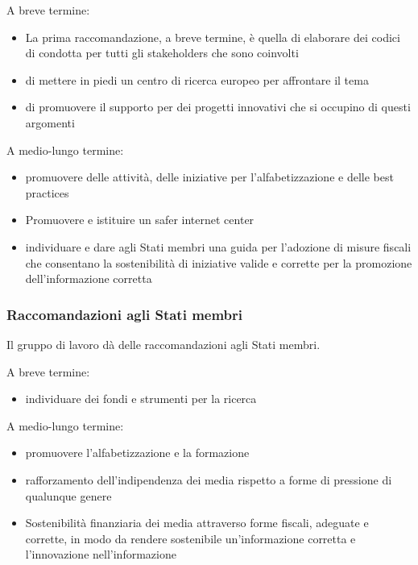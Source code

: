 A breve termine: 
\begin{itemize}
    \item La prima raccomandazione, a breve termine, è quella di elaborare dei codici di condotta per tutti gli stakeholders che sono coinvolti
    \item di mettere in piedi un centro di ricerca europeo per affrontare il tema
    \item di promuovere il supporto per dei progetti innovativi che si occupino di questi argomenti
\end{itemize}

A medio-lungo termine:

\begin{itemize}
    \item promuovere delle attività, delle iniziative per l'alfabetizzazione e delle best practices
    \item Promuovere e istituire un safer internet center
    \item individuare e dare agli Stati membri una guida per l'adozione di misure fiscali che consentano la sostenibilità di iniziative valide e corrette per la promozione dell'informazione corretta
\end{itemize}

\subsubsection{Raccomandazioni agli Stati membri}
Il gruppo di lavoro dà delle raccomandazioni agli Stati membri.\par

A breve termine:

\begin{itemize}
    \item individuare dei fondi e strumenti per la ricerca
\end{itemize}

A medio-lungo termine:
\begin{itemize}
    \item promuovere l'alfabetizzazione e la formazione
    \item rafforzamento dell'indipendenza dei media rispetto a forme di pressione di qualunque genere
    \item Sostenibilità finanziaria dei media attraverso forme fiscali, adeguate e corrette, in modo da rendere sostenibile un'informazione corretta e l'innovazione nell'informazione
\end{itemize}


